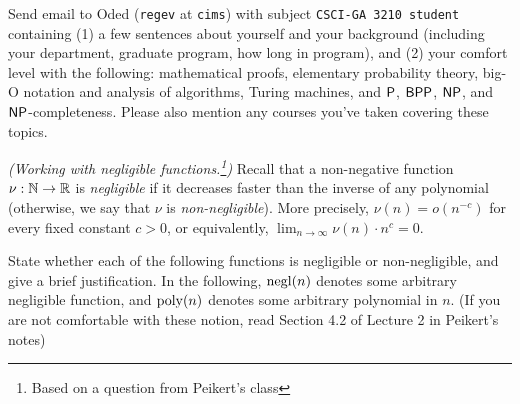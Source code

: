 \begin{questions}


  \question
	Send email to
  Oded (\texttt{regev} at \texttt{cims}) with subject \texttt{CSCI-GA 3210
    student} containing (1) a few sentences about yourself and your
  background (including your department, graduate program, how long in program), and (2) your comfort level
  with the following: mathematical proofs, elementary probability
  theory, big-O notation and analysis of algorithms, Turing machines,
  and $\P$, $\BPP$, $\NP$, and $\NP$-completeness.  Please also
  mention any courses you've taken covering these topics.


  \question
	\emph{(Working with negligible functions.\footnote{Based on a question from Peikert's class\label{fn:peikert}})}  Recall that a
  non-negative function $\nu : \N \to \R$ is \emph{negligible} if it
  decreases faster than the inverse of any polynomial (otherwise, we
  say that $\nu$ is \emph{non-negligible}).  More precisely, $\nu(n) =
  o(n^{-c})$ for every fixed constant $c > 0$, or equivalently,
  $\lim_{n \to \infty} \nu(n) \cdot n^{c} = 0$. 

  State whether each of the following functions is negligible or
  non-negligible, and give a brief justification.  In the following,
  $\negl(n)$ denotes some arbitrary negligible function, and
  $\poly(n)$ denotes some arbitrary polynomial in $n$.
	(If you are not comfortable with these notion, read Section 4.2 of Lecture 2
	in Peikert's notes)

\end{questions}
